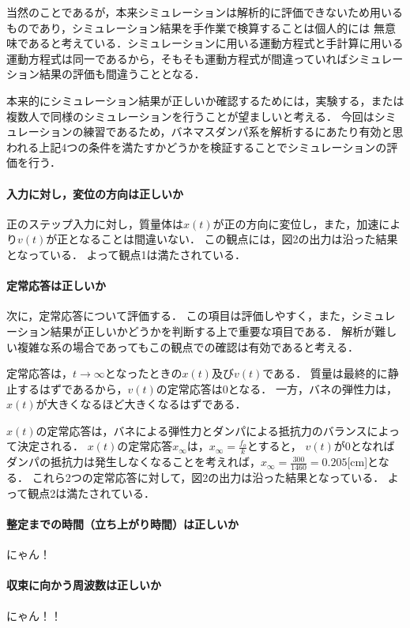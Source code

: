 \documentclass[dvipdfmx,titlepage,a4j]{jsarticle}  %
\begin{document}
当然のことであるが，本来シミュレーションは解析的に評価できないため用いるものであり，シミュレーション結果を手作業で検算することは個人的には
無意味であると考えている．シミュレーションに用いる運動方程式と手計算に用いる運動方程式は同一であるから，そもそも運動方程式が間違っていればシミュレーション結果の評価も間違うこととなる．

本来的にシミュレーション結果が正しいか確認するためには，実験する，または複数人で同様のシミュレーションを行うことが望ましいと考える．
今回はシミュレーションの練習であるため，バネマスダンパ系を解析するにあたり有効と思われる上記4つの条件を満たすかどうかを検証することでシミュレーションの評価を行う．

\paragraph{入力に対し，変位の方向は正しいか\\}
正のステップ入力に対し，質量体は$x(t)$が正の方向に変位し，また，加速により$v(t)$が正となることは間違いない．
この観点には，図2の出力は沿った結果となっている．
よって観点1は満たされている．

\paragraph{定常応答は正しいか\\}
次に，定常応答について評価する．
この項目は評価しやすく，また，シミュレーション結果が正しいかどうかを判断する上で重要な項目である．
解析が難しい複雑な系の場合であってもこの観点での確認は有効であると考える．

定常応答は，$t \rightarrow \infty$となったときの$x(t)$及び$v(t)$である．
質量は最終的に静止するはずであるから，$v(t)$の定常応答は0となる．
一方，バネの弾性力は，$x(t)$が大きくなるほど大きくなるはずである．

$x(t)$の定常応答は，バネによる弾性力とダンパによる抵抗力のバランスによって決定される．
$x(t)$の定常応答$x_\infty$は，$x_\infty = \frac{f_o}{k}$とすると，
$v(t)$が0となればダンパの抵抗力は発生しなくなることを考えれば，$x_\infty = \frac{300}{1460} = 0.205$[cm]となる．
これら2つの定常応答に対して，図2の出力は沿った結果となっている．
よって観点2は満たされている．

\paragraph{整定までの時間（立ち上がり時間）は正しいか\\}
にゃん！
\paragraph{収束に向かう周波数は正しいか\\}
にゃん！！
\end{document}

